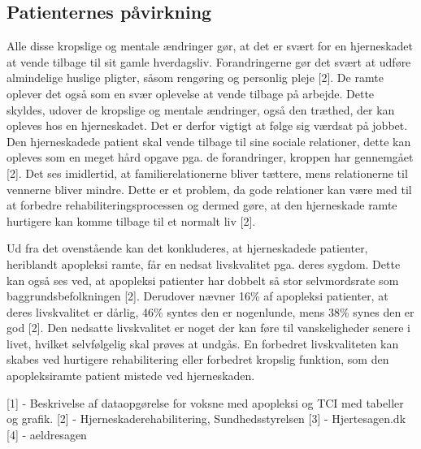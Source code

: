 \subsection{Patienternes påvirkning}
Alle disse kropslige og mentale ændringer gør, at det er svært for en hjerneskadet at vende tilbage til sit gamle hverdagsliv. Forandringerne gør det svært at udføre almindelige huslige pligter, såsom rengøring og personlig pleje [2]. De ramte oplever det også som en svær oplevelse at vende tilbage på arbejde. Dette skyldes, udover de kropslige og mentale ændringer, også den træthed, der kan opleves hos en hjerneskadet. Det er derfor vigtigt at følge sig værdsat på jobbet. Den hjerneskadede patient skal vende tilbage til sine sociale relationer,  dette kan opleves som en meget hård opgave pga. de forandringer, kroppen har gennemgået [2]. Det ses imidlertid, at familierelationerne bliver tættere, mens relationerne til vennerne bliver mindre. Dette er et problem, da gode relationer kan være med til at forbedre rehabiliteringsprocessen og dermed gøre, at den hjerneskade ramte hurtigere kan komme tilbage til et normalt liv [2].

Ud fra  det ovenstående kan det konkluderes, at hjerneskadede patienter, heriblandt apopleksi ramte, får en nedsat livskvalitet pga. deres sygdom. Dette kan også ses ved, at apopleksi patienter har dobbelt så stor selvmordsrate som baggrundsbefolkningen [2]. Derudover nævner 16\% af apopleksi patienter, at deres livskvalitet er dårlig, 46\% syntes den er nogenlunde, mens 38\% synes den er god [2]. Den nedsatte livskvalitet er noget der kan føre til vanskeligheder senere i livet, hvilket selvfølgelig skal prøves at undgås. En forbedret livskvaliteten kan skabes ved hurtigere rehabilitering eller forbedret kropslig funktion, som den apopleksiramte patient mistede ved hjerneskaden.  


[1] - Beskrivelse af dataopgørelse for voksne med apopleksi og TCI med tabeller og grafik. 
[2] - Hjerneskaderehabilitering, Sundhedsstyrelsen
[3] - Hjertesagen.dk
[4] - aeldresagen